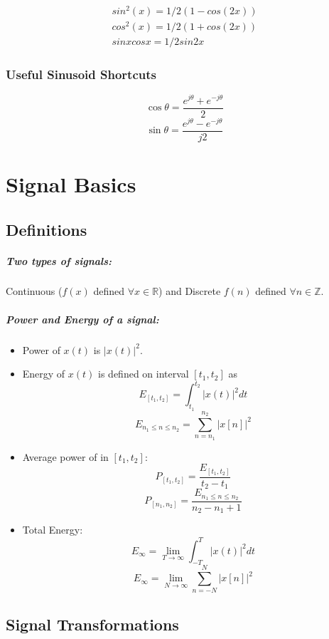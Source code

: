 \documentclass[a4paper,12pt]{report}
\def\reals{\mathbb{R}}
\def\integers{\mathbb{Z}}
\begin{document}
\begin{eqnarray}
sin^2 (x) = 1/2 (1-cos(2x)) \\
cos^2 (x) = 1/2 (1+cos(2x)) \\
sinxcosx = 1/2 sin2x
\end{eqnarray}


\subsection{Useful Sinusoid Shortcuts}
$$\cos\theta = \frac{e^{j\theta} + e^{-j\theta}}{2}$$
$$\sin\theta = \frac{e^{j\theta} - e^{-j\theta}}{j2}$$




\chapter{Signal Basics}

\section{Definitions}

\paragraph{Two types of signals: } Continuous ($f(x)$ defined $\forall x \in \reals$) and Discrete $f(n)$ defined $\forall n \in \integers$.

\paragraph{Power and Energy of a signal: }
\begin{itemize}
	\item Power of $x(t)$ is $|x(t)|^2$.
	\item Energy of $x(t)$ is defined on interval $[t_1, t_2]$ as 
	$$E_{[t_1, t_2]} = \int_{t_1}^{t_2} |x(t)|^2 dt$$
	$$E_{n_1 \leq n \leq n_2} = \sum_{n=n_1}^{n_2} |x[n]|^2$$

	\item Average power of in $[t_1, t_2]$:
	$$P_{[t_1, t_2]} = \frac{E_{[t_1, t_2]}}{t_2 - t_1}$$
	$$P_{[n_1, n_2]} = \frac{E_{n_1 \leq n \leq n_2}}{n_2 - n_1 + 1}$$
	\item Total Energy: 
	$$E_{\infty} = \lim_{T\to\infty} \int_{-T}^T |x(t)|^2 dt$$
	$$E_{\infty} = \lim_{N\to\infty} \sum_{n = -N}^{N} |x[n]|^2$$
\end{itemize}


\section{Signal Transformations}
\end{document}
